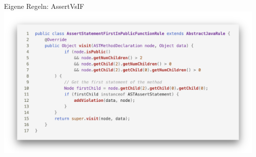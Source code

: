 \documentclass{sdqbeamer}
\begin{document}
\begin{frame}[fragile]{Eigene Regeln: AssertVsIF}
    \vspace{-0.5cm}
    \hspace{-0.7cm}
    \includegraphics[scale=0.23]{logos/CustomRuleAssertVsIf.png}
\end{frame}
\end{document}
